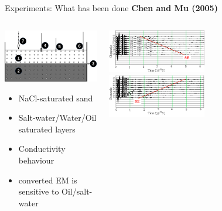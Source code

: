 \documentclass[utf8]{beamer} \usetheme{lfcr} %
\begin{document}
\begin{frame}{Experiments: What has been done}
  {\textbf{Chen and Mu (2005)}}

  \begin{columns}
    \begin{column}{0.5\textwidth}
      \includegraphics[width=\textwidth]{Chen_and_Mu_a_fig1}%

      \begin{itemize}
        \item NaCl-saturated sand
        \item Salt-water/Water/Oil saturated layers
        \item Conductivity behaviour
          \item converted EM is sensitive to Oil/salt-water
      \end{itemize}
     
    \end{column}
    \begin{column}{0.5\textwidth}
      \includegraphics[angle=-90,origin=c,width=0.5\textwidth]{Chen_and_Mu_a_fig2}%
      \includegraphics[angle=-90,origin=c,width=0.5\textwidth]{Chen_and_Mu_a_fig3}%
    \end{column}
  \end{columns}

\end{frame}
\end{document}
